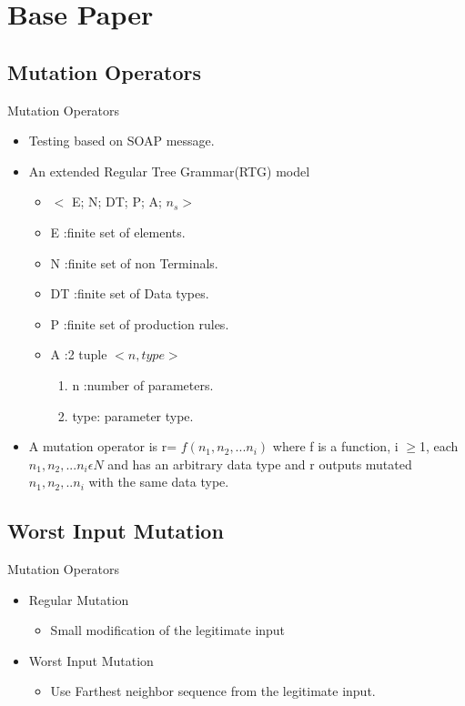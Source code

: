 \documentclass{beamer}
\begin{document}
\section{Base Paper}

\subsection{Mutation Operators}


\begin{frame}{Mutation Operators}{}
	\begin{itemize}
		\item Testing based on SOAP message.
		\item An extended Regular Tree Grammar(RTG) model
			\begin{itemize}
				\item $ < $ E; N; DT; P; A; $n_{s} > $
				\item E :finite set of elements.
				\item N :finite set of non Terminals.
				\item DT :finite set of Data types.
				\item P :finite set of production rules.
				\item A :2 tuple $ <n,type> $
				\begin{enumerate}
					\item n :number of parameters.
					\item type: parameter type.
				\end{enumerate} 
			\end{itemize}
		\item A mutation operator is
		r= $ f (n_{1}, n_{2},... n_{i}) $ where f is a function, i $ \geq $1, each
		$ n_{1}, n_{2},... n_{i}\epsilon N$ and has an arbitrary data type and r outputs mutated $ n_{1},n_{2},..n_{i} $ with the same data type.
		
		
	\end{itemize}
\end{frame}

\subsection{Worst Input Mutation }
\begin{frame}{Mutation Operators}{}
	\begin{itemize}
		\item Regular Mutation
		\begin{itemize}
			\item Small modification of the legitimate input
		\end{itemize}
		\pause
		\item Worst Input Mutation
		\begin{itemize}
			\item Use Farthest neighbor sequence from the legitimate input.
		\end{itemize}		
	\end{itemize}
\end{frame}
\end{document}
